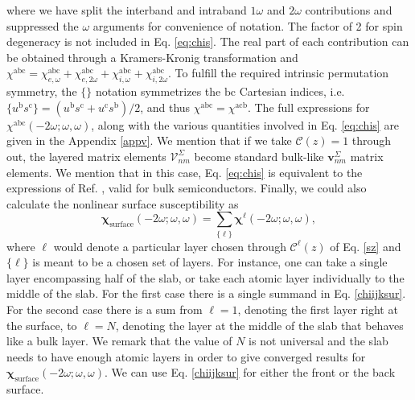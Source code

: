 where we have split the interband and intraband $1\omega$ and $2\omega$
contributions and suppressed the $\omega$ arguments for convenience of notation.
The factor of 2 for spin degeneracy is not included in Eq. \eqref{eq:chis}. The
real part of each contribution can be obtained through a Kramers-Kronig
transformation\cite{nicolasPRB14} and $\chi^{\mathrm{a}\mathrm{b}\mathrm{c}}=
\chi^{\mathrm{a}\mathrm{b}\mathrm{c}}_{e,\omega} 
+\chi^{\mathrm{a}\mathrm{b}\mathrm{c}}_{e,2\omega}
+\chi^{\mathrm{a}\mathrm{b}\mathrm{c}}_{i,\omega} 
+\chi^{\mathrm{a}\mathrm{b}\mathrm{c}}_{i,2\omega}
$.
To fulfill the required intrinsic permutation symmetry, the $\{\}$ notation
symmetrizes the $\mathrm{b}\mathrm{c}$ Cartesian indices, i.e. $\{u^{\mathrm{b}}
s^{\mathrm{c}}\}=(u^{\mathrm{b}}s^{\mathrm{c}}+u^{\mathrm{c}}s^{\mathrm{b}})/2$,
and thus
$\chi^{\mathrm{a}\mathrm{b}\mathrm{c}}=\chi^{\mathrm{a}\mathrm{c}\mathrm{b}}$.
The full expressions for
$\chi^{\mathrm{a}\mathrm{b}\mathrm{c}}(-2\omega;\omega,\omega)$, along with the
various quantities involved in Eq. \eqref{eq:chis} are given in the Appendix
\ref{appv}. We mention that if we take $\boldsymbol{\mathcal{C}}(z)=1$ through
out, the layered matrix elements $\boldsymbol{\mathcal{V}}^{\Sigma}_{nm}$ become
standard bulk-like $\mathbf{v}^{\Sigma}_{nm}$ matrix elements. We mention that
in this case, Eq. \eqref{eq:chis} is equivalent to the expressions of Ref.
\cite{cabellosPRB09}, valid for bulk semiconductors. Finally, we could also
calculate the nonlinear surface susceptibility as
\begin{equation}
\boldsymbol{\chi}_{\mathrm{surface}}(-2\omega;\omega,\omega)
= \sum_{\{\ell\}}\boldsymbol{\chi}^\ell(-2\omega;\omega,\omega),
\label{chiijksur}
\end{equation} 
where $\ell$ would denote a particular layer chosen through
$\boldsymbol{\mathcal{C}}^\ell(z)$ of Eq. \eqref{sz} and $\{\ell\}$ is meant to
be a chosen set of layers. For instance, one can take a single layer
encompassing half of the slab, or take each atomic layer individually to the
middle of the slab. For the first case there is a single summand in Eq.
\eqref{chiijksur}. For the second case there is a sum from $\ell=1$, denoting
the first layer right at the surface, to $\ell=N$, denoting the layer at the
middle of the slab that behaves like a bulk layer. We remark that the value of
$N$ is not universal and the slab needs to have enough atomic layers in order to
give converged results for
$\boldsymbol{\chi}_{\mathrm{surface}}(-2\omega;\omega,\omega)$. We can use Eq.
\eqref{chiijksur} for either the front or the back surface.


